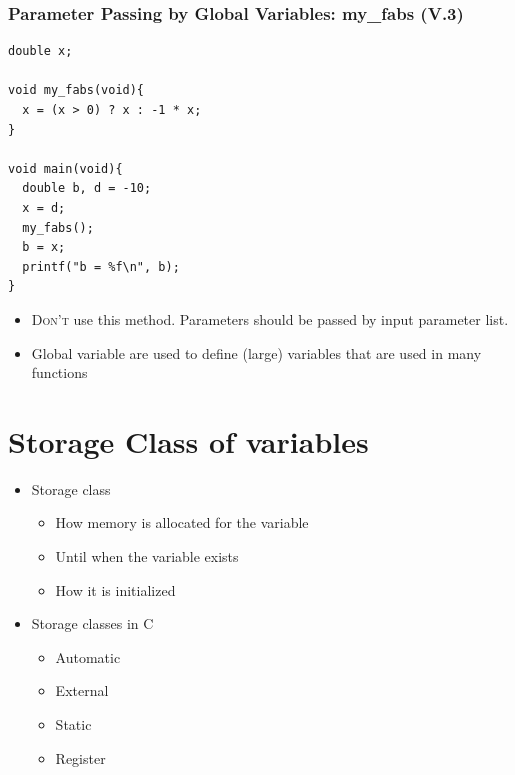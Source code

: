 \documentclass{../c-lecture}
\begin{document}
\begin{frame}[fragile]
  \frametitle{Parameter Passing by Global Variables: my\_fabs (V.3)}
  \begin{verbatim}
double x;

void my_fabs(void){
  x = (x > 0) ? x : -1 * x;
}

void main(void){
  double b, d = -10;
  x = d;
  my_fabs();
  b = x;
  printf("b = %f\n", b);
}
  \end{verbatim}
\end{frame}

\begin{frame}
  \begin{itemize}
    \item
      \textsc{\color{RubineRed} Don't} use this method. Parameters should be
      passed by input parameter list.
    \item
      Global variable are used to define (large) variables that are used in
      many functions
  \end{itemize}
\end{frame}

\section{Storage Class of variables}

\begin{frame}
  \begin{itemize}
    \item Storage class
    \begin{itemize}
      \item How memory is allocated for the variable
      \item Until when the variable exists
      \item How it is initialized
    \end{itemize}
    \item Storage classes in C
    \begin{itemize}
      \item Automatic
      \item External
      \item Static
      \item Register
    \end{itemize}
  \end{itemize}
\end{frame}
\end{document}
